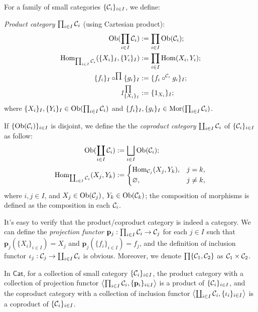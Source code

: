 \documentclass{article}
\begin{document}
\begin{defi}
	For a family of small categories $\{\mathcal{C}_i\}_{i\in I}$, we define:
	
	\emph{Product category} $\prod_{i\in I}{\mathcal{C}_i}$ (using Cartesian product):
	\begin{align*}
		\mathrm{Ob}(\prod_{i\in I}{\mathcal{C}_i})							&:= \prod_{i\in I}{\mathrm{Ob}(\mathcal{C}_i)};\\
		\mathrm{Hom}_{\prod_{i\in I}{\mathcal{C}_i}}(\{X_i\}_I,\{Y_i\}_I)	&:= \prod_{i\in I}{\mathrm{Hom}(X_i,Y_i)};\\
		\{f_i\}_I\circ^{\prod}\{g_i\}_I						&:= \{f_i\circ^{\mathcal{C}_i}g_i\}_I;\\
		\mathit{1}^{\prod}_{\{X_i\}_I}			&:= \{1_{X_i}\}_I;
	\end{align*}
	where $\{X_i\}_I,\{Y_i\}_I\in\mathrm{Ob}(\prod_{i\in I}{\mathcal{C}_i})$ and $\{f_i\}_I,\{g_i\}_I\in\mathrm{Mor}(\prod_{i\in I}{\mathcal{C}_i})$.
	
	If $\{\mathrm{Ob}(\mathcal{C}_i)\}_{i\in I}$ is disjoint, we define the the \emph{coproduct category} $\coprod_{i\in I}{\mathcal{C}_i}$ of $\{\mathcal{C}_i\}_{i\in I}$ as follow:
	\begin{align*}
		\mathrm{Ob}(\coprod_{i\in I}{\mathcal{C}_i})			&:= \bigsqcup_{i\in I}{\mathrm{Ob}(\mathcal{C}_i)};\\
		\mathrm{Hom}_{\coprod_{i\in I}{\mathcal{C}_i}}(X_j,Y_k)	&:= \left\{\begin{aligned} & \mathrm{Hom}_{\mathcal{C}_j}(X_j,Y_k), & j=k, \\ & \varnothing, & j\ne k, \end{aligned}\right.
	\end{align*}
	where $i,j\in I$, and $X_j\in\mathrm{Ob}(\mathcal{C}_j)$, $Y_k\in\mathrm{Ob}(\mathcal{C}_k)$; the composition of morphisms is defined as the composition in each $\mathcal{C}_i$.
	
	It's easy to verify that the product/coproduct category is indeed a category. We can define the \emph{projection functor} $\mathbf{p}_j:\prod_{i\in I}{\mathcal{C}_i}\to\mathcal{C}_j$ for each $j\in I$ such that $\mathbf{p}_j(\{X_i\}_{i\in I})=X_j$ and $\mathbf{p}_j(\{f_i\}_{i\in I})=f_j$, and the definition of inclusion functor $\iota_j:\mathcal{C}_j\to\coprod_{i\in I}{\mathcal{C}_i}$ is obvious. Moreover, we denote $\prod\{\mathcal{C}_1,\mathcal{C}_2\}$ as $\mathcal{C}_1\times \mathcal{C}_2$.
\end{defi}


\begin{cor}
	In $\mathsf{Cat}$, for a collection of small category $\{\mathcal{C}_i\}_{i\in I}$, the product category with a collection of projection functor $\left<\prod_{i\in I}{\mathcal{C}_i},\{\mathbf{p}_i\}_{i\in I}\right>$ is a product of $\{\mathcal{C}_i\}_{i\in I}$, and the coproduct category with a collection of inclusion functor $\left<\coprod_{i\in I}{\mathcal{C}_i},\{\iota_i\}_{i\in I}\right>$ is a coproduct of $\{\mathcal{C}_i\}_{i\in I}$.
\end{cor}
\end{document}
